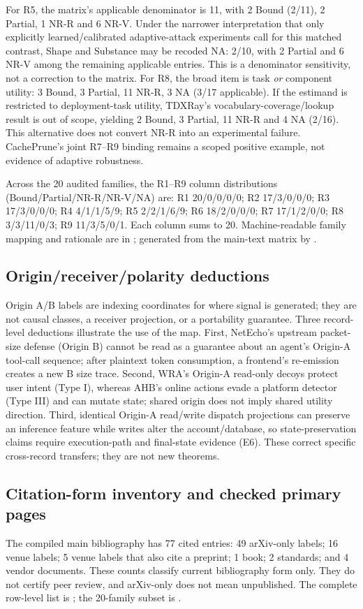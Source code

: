For R5, the matrix's applicable denominator is 11, with 2 Bound (2/11), 2 Partial, 1 NR-R and 6 NR-V. Under the narrower interpretation that only explicitly learned/calibrated adaptive-attack experiments call for this matched contrast, Shape and Substance may be recoded NA: 2/10, with 2 Partial and 6 NR-V among the remaining applicable entries. This is a denominator sensitivity, not a correction to the matrix. For R8, the broad item is task \emph{or} component utility: 3 Bound, 3 Partial, 11 NR-R, 3 NA (3/17 applicable). If the estimand is restricted to deployment-task utility, TDXRay's vocabulary-coverage/lookup result is out of scope, yielding 2 Bound, 3 Partial, 11 NR-R and 4 NA (2/16). This alternative does not convert NR-R into an experimental failure. CachePrune's joint R7--R9 binding remains a scoped positive example, not evidence of adaptive robustness.

Across the 20 audited families, the R1--R9 column distributions (Bound/Partial/NR-R/NR-V/NA) are: R1 20/0/0/0/0; R2 17/3/0/0/0; R3 17/3/0/0/0; R4 4/1/1/5/9; R5 2/2/1/6/9; R6 18/2/0/0/0; R7 17/1/2/0/0; R8 3/3/11/0/3; R9 11/3/5/0/1. Each column sums to 20. Machine-readable family mapping and rationale are in ; generated from the main-text matrix by .

\subsection{Origin/receiver/polarity deductions}
Origin A/B labels are indexing coordinates for where signal is generated; they are not causal classes, a receiver projection, or a portability guarantee. Three record-level deductions illustrate the use of the map. First, NetEcho's upstream packet-size defense (Origin B) cannot be read as a guarantee about an agent's Origin-A tool-call sequence; after plaintext token consumption, a frontend's re-emission creates a new B size trace. Second, WRA's Origin-A read-only decoys protect user intent (Type I), whereas AHB's online actions evade a platform detector (Type III) and can mutate state; shared origin does not imply shared utility direction. Third, identical Origin-A read/write dispatch projections can preserve an inference feature while writes alter the account/database, so state-preservation claims require execution-path and final-state evidence (E6). These correct specific cross-record transfers; they are not new theorems.

\subsection{Citation-form inventory and checked primary pages}
The compiled main bibliography has 77 cited entries: 49 arXiv-only labels; 16 venue labels; 5 venue labels that also cite a preprint; 1 book; 2 standards; and 4 vendor documents. These counts classify current bibliography form only. They do not certify peer review, and arXiv-only does not mean unpublished. The complete row-level list is ; the 20-family subset is .

